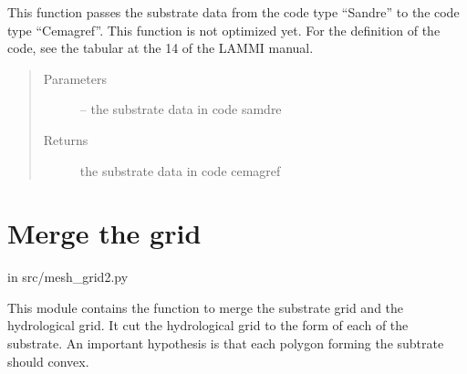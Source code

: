 \documentclass[letterpaper,10pt,english]{sphinxmanual}
\begin{document}

\begin{fulllineitems}
\label{\detokenize{index:src.substrate.sandre_to_cemagref}}
This function passes the substrate data from the code type ``Sandre'' to the code type ``Cemagref''. This function is
not optimized yet. For the definition of the code, see the tabular at the 14 of the LAMMI manual.
\begin{quote}\begin{description}
\item[{Parameters}] \leavevmode
{} -- the substrate data in code samdre

\item[{Returns}] \leavevmode
the substrate data in code cemagref

\end{description}\end{quote}

\end{fulllineitems}



\section{Merge the grid}
\label{\detokenize{index:merge-the-grid}}
in src/mesh\_grid2.py

This module contains the function to merge the substrate grid and the hydrological grid.
It cut the hydrological grid to the form of each of the substrate. An important hypothesis
is that each polygon forming the subtrate should convex.
\label{\detokenize{index:module-src.mesh_grid2}}
\end{document}
